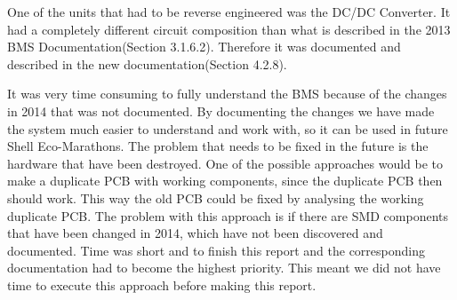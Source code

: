 One of the units that had to be reverse engineered was the DC/DC Converter. It had a completely different circuit composition than what is described in the 2013 BMS Documentation\cite{BMSDocumentation}(Section 3.1.6.2). Therefore it was documented and described in the new documentation\cite{AU2}(Section 4.2.8). 

It was very time consuming to fully understand the BMS because of the changes in 2014 that was not documented. By documenting the changes we have made the system much easier to understand and work with, so it can be used in future Shell Eco-Marathons. The problem that needs to be fixed in the future is the hardware that have been destroyed. One of the possible approaches would be to make a duplicate PCB with working components, since the duplicate PCB then should work. This way the old PCB could be fixed by analysing the working duplicate PCB. The problem with this approach is if there are SMD components that have been changed in 2014, which have not been discovered and documented. Time was short and to finish this report and the corresponding documentation had to become the highest priority. This meant we did not have time to execute this approach before making this report.